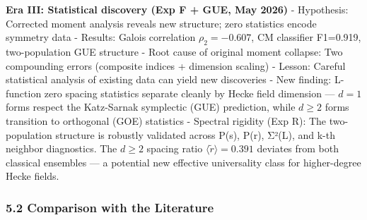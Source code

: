 \documentclass[
]{article}
\begin{document}
\textbf{Era III: Statistical discovery (Exp F + GUE, May 2026)} -
Hypothesis: Corrected moment analysis reveals new structure; zero
statistics encode symmetry data - Results: Galois correlation
\(\rho_2 = -0.607\), CM classifier F1=0.919, two-population GUE
structure - Root cause of original moment collapse: Two compounding
errors (composite indices + dimension scaling) - Lesson: Careful
statistical analysis of existing data can yield new discoveries - New
finding: L-function zero spacing statistics separate cleanly by Hecke
field dimension --- \(d=1\) forms respect the Katz-Sarnak symplectic
(GUE) prediction, while \(d\ge 2\) forms transition to orthogonal (GOE)
statistics - Spectral rigidity (Exp R): The two-population structure is
robustly validated across P(s), P(r), Σ²(L), and k-th neighbor
diagnostics. The \(d\ge 2\) spacing ratio
\(\langle\tilde{r}\rangle = 0.391\) deviates from both classical
ensembles --- a potential new effective universality class for
higher-degree Hecke fields.

\hypertarget{comparison-with-the-literature}{%
\subsubsection{5.2 Comparison with the
Literature}\label{comparison-with-the-literature}}
\end{document}
